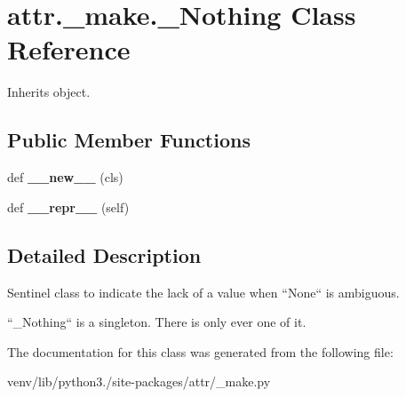 \hypertarget{classattr_1_1__make_1_1___nothing}{}\section{attr.\+\_\+make.\+\_\+\+Nothing Class Reference}
\label{classattr_1_1__make_1_1___nothing}


Inherits object.

\subsection*{Public Member Functions}
\begin{DoxyCompactItemize}
\item 
\mbox{\label{classattr_1_1__make_1_1___nothing_a680e9e7f469b4c9f661d5c739b236401}} 
def {\bfseries \+\_\+\+\_\+new\+\_\+\+\_\+} (cls)
\item 
\mbox{\label{classattr_1_1__make_1_1___nothing_a60abb05006de981372a5c92dc697c180}} 
def {\bfseries \+\_\+\+\_\+repr\+\_\+\+\_\+} (self)
\end{DoxyCompactItemize}


\subsection{Detailed Description}
\begin{DoxyVerb}Sentinel class to indicate the lack of a value when ``None`` is ambiguous.

``_Nothing`` is a singleton. There is only ever one of it.
\end{DoxyVerb}
 

The documentation for this class was generated from the following file\+:\begin{DoxyCompactItemize}
\item 
venv/lib/python3./site-\/packages/attr/\+\_\+make.\+py\end{DoxyCompactItemize}
